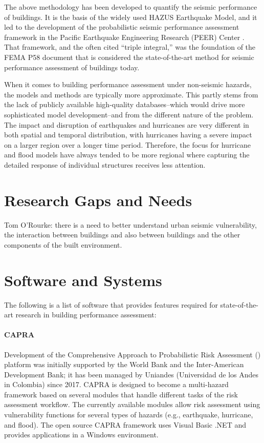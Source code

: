 The above methodology has been developed to quantify the seismic performance of buildings. It is the basis of the widely used HAZUS Earthquake Model, and it led to the development of the probabilistic seismic performance assessment framework in the Pacific Earthquake Engineering Research (PEER) Center \citep{porter2001assemblybased}. That framework, and the often cited ``triple integral,'' was the foundation of the FEMA P58 document that is considered the state-of-the-art method for seismic performance assessment of buildings today.

When it comes to building performance assessment under non-seismic hazards, the models and methods are typically more approximate. This partly stems from the lack of publicly available high-quality databases--which would drive more sophisticated model development--and from the different nature of the problem. The impact and disruption of earthquakes and hurricanes are very different in both spatial and temporal distribution, with hurricanes having a severe impact on a larger region over a longer time period. Therefore, the focus for hurricane and flood models have always tended to be more regional where capturing the detailed response of individual structures receives less attention.

\section{Research Gaps and Needs}
\label{sec:perf_bldg_gaps}

Tom O'Rourke: there is a need to better understand urban seismic vulnerability, the interaction between buildings and also between buildings and the other components of the built environment.

\section{Software and Systems}
\label{sec:perf_bldg_tools}

The following is a list of software that provides features required for state-of-the-art research in building performance assessment:

\paragraph{CAPRA} Development of the Comprehensive Approach to Probabilistic Risk Assessment () platform was initially supported by the World Bank and the Inter-American Development Bank; it has been managed by Uniandes (Universidad de los Andes in Colombia) since 2017. CAPRA is designed to become a multi-hazard framework based on several modules that handle different tasks of the risk assessment workflow. The currently available modules allow risk assessment using vulnerability functions for several types of hazards (e.g., earthquake, hurricane, and flood). The open source CAPRA framework uses Visual Basic .NET and provides applications in a Windows environment.

